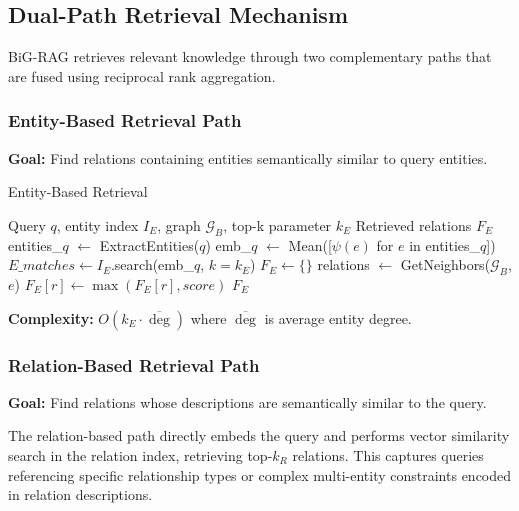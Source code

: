 \documentclass[11pt,a4paper]{article}
\begin{document}
\subsection{Dual-Path Retrieval Mechanism}

BiG-RAG retrieves relevant knowledge through two complementary paths that are fused using reciprocal rank aggregation.

\subsubsection{Entity-Based Retrieval Path}

\textbf{Goal:} Find relations containing entities semantically similar to query entities.

\begin{algorithm}
\caption{Entity-Based Retrieval}
\begin{algorithmic}[1]
\REQUIRE Query $q$, entity index $I_E$, graph $\mathcal{G}_B$, top-k parameter $k_E$
\ENSURE Retrieved relations $F_E$
\STATE entities\_$q$ $\leftarrow$ ExtractEntities($q$) 
\STATE emb\_$q$ $\leftarrow$ Mean([$\psi(e)$ for $e$ in entities\_$q$])
\STATE $E\_matches \leftarrow I_E$.search(emb\_$q$, $k=k_E$) 
\STATE $F_E \leftarrow \{\}$
    \STATE relations $\leftarrow$ GetNeighbors($\mathcal{G}_B$, $e$) 
        \STATE $F_E[r] \leftarrow \max(F_E[r], score)$ 
    \ENDFOR
\ENDFOR
\RETURN $F_E$ 
\end{algorithmic}
\end{algorithm}

\textbf{Complexity:} $O(k_E \cdot \overline{\deg})$ where $\overline{\deg}$ is average entity degree.

\subsubsection{Relation-Based Retrieval Path}

\textbf{Goal:} Find relations whose descriptions are semantically similar to the query.

The relation-based path directly embeds the query and performs vector similarity search in the relation index, retrieving top-$k_R$ relations. This captures queries referencing specific relationship types or complex multi-entity constraints encoded in relation descriptions.
\end{document}
